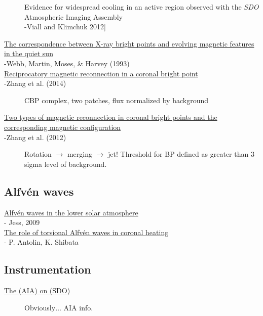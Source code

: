 \documentclass{article}
\begin{document}
\begin{description}
        {Evidence for widespread cooling in an active region observed with the
        \textit{SDO} Atmospheric Imaging Assembly}\\
        -Viall and Klimchuk 2012]
	\item [\href{}
        {The correspondence between X-ray bright points and evolving magnetic features
        in the quiet sun}\\
        -Webb, Martin, Moses, \& Harvey (1993)]
	\item [\href{http://ads.nao.ac.jp/abs/2014A\%26A...568A..30Z}
        {Reciprocatory magnetic reconnection in a coronal bright point}\\
        -Zhang et al. (2014)]
        CBP complex, two patches, flux normalized by background
	\item [\href{http://cdsads.u-strasbg.fr/abs/2012ApJ...746...19Z}
        {Two types of magnetic reconnection in coronal bright points and the
        corresponding magnetic configuration}\\
        -Zhang et al. (2012)]
        Rotation $\rightarrow$ merging $\rightarrow$ jet! Threshold for BP defined
        as greater than 3 sigma level of background.
\end{description}


\subsection{Alfv\'en waves}
\begin{description}
    \item [\href{http://arxiv.org/abs/0903.3546}
        {Alfv\'en waves in the lower solar atmosphere}\\
        - Jess, 2009]
    \item [\href{https://arxiv.org/abs/0910.0962}
        {The role of torsional Alfv\'en waves in coronal heating}\\
        - P. Antolin, K. Shibata]
\end{description}

\subsection{Instrumentation}
\begin{description}
    \item [\href{http://cdsads.u-strasbg.fr/abs/2012SoPh..275...17L}
            {The (AIA) on (SDO)}]
            Obviously$\ldots$ AIA info.
\end{description}
\end{document}
